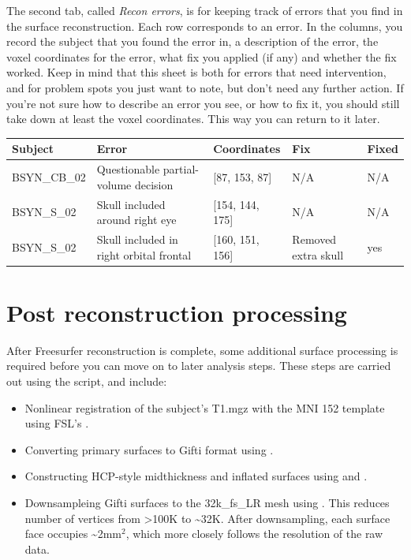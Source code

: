\documentclass[letterpaper,10pt,openany,oneside]{sphinxmanual}
\begin{document}
The second tab, called \emph{Recon errors}, is for keeping track of errors that you
find in the surface reconstruction. Each row corresponds to an error. In the
columns, you record the subject that you found the error in, a description of
the error, the voxel coordinates for the error, what fix you applied (if any)
and whether the fix worked. Keep in mind that this sheet is both for errors
that need intervention, and for problem spots you just want to note, but don't
need any further action. If you're not sure how to describe an error you see,
or how to fix it, you should still take down at least the voxel coordinates.
This way you can return to it later.

\begin{tabulary}{\linewidth}{|L|L|L|L|L|}
\hline
\textsf{\relax 
Subject
} & \textsf{\relax 
Error
} & \textsf{\relax 
Coordinates
} & \textsf{\relax 
Fix
} & \textsf{\relax 
Fixed
}\\
\hline
BSYN\_CB\_02
 & 
Questionable partial-volume decision
 & 
{[}87, 153, 87{]}
 & 
N/A
 & 
N/A
\\

BSYN\_S\_02
 & 
Skull included around right eye
 & 
{[}154, 144, 175{]}
 & 
N/A
 & 
N/A
\\

BSYN\_S\_02
 & 
Skull included in right orbital frontal
 & 
{[}160, 151, 156{]}
 & 
Removed extra skull
 & 
yes
\\
\hline\end{tabulary}



\section{Post reconstruction processing}
\label{surface_reconstruction:post-reconstruction-processing}
After Freesurfer reconstruction is complete, some additional surface processing
is required before you can move on to later analysis steps. These steps are
carried out using the  script, and include:
\begin{itemize}
\item {} 
Nonlinear registration of the subject's T1.mgz with the MNI 152 template
using FSL's .

\item {} 
Converting primary surfaces to Gifti format using .

\item {} 
Constructing HCP-style midthickness and inflated surfaces using  and .

\item {} 
Downsampleing Gifti surfaces to the 32k\_fs\_LR mesh using . This reduces number of vertices from \textgreater{}100K to \textasciitilde{}32K.
After downsampling, each surface face occupies \textasciitilde{}2mm$^{\text{2}}$, which more
closely follows the resolution of the raw data.

\end{itemize}
\end{document}
